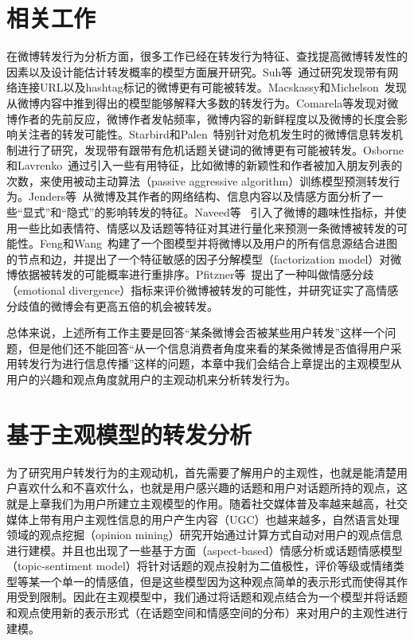 \section{相关工作}
\label{ch6_relatedwork}
在微博转发行为分析方面，很多工作已经在转发行为特征、查找提高微博转发性的因素以及设计能估计转发概率的模型方面展开研究。Suh等~通过研究发现带有网络连接URL以及hashtag标记的微博更有可能被转发。Macskassy和Michelson~发现从微博内容中推到得出的模型能够解释大多数的转发行为。Comarela等发现对微博作者的先前反应，微博作者发帖频率，微博内容的新鲜程度以及微博的长度会影响关注者的转发可能性。Starbird和Palen~特别针对危机发生时的微博信息转发机制进行了研究，发现带有跟带有危机话题关键词的微博更有可能被转发。Osborne和Lavrenko~通过引入一些有用特征，比如微博的新颖性和作者被加入朋友列表的次数，来使用被动主动算法（passive aggressive algorithm）训练模型预测转发行为。Jenders等~从微博及其作者的网络结构、信息内容以及情感方面分析了一些“显式”和“隐式”的影响转发的特征。Naveed等~
引入了微博的趣味性指标，并使用一些比如表情符、情感以及话题等特征对其进行量化来预测一条微博被转发的可能性。Feng和Wang~构建了一个图模型并将微博以及用户的所有信息源结合进图的节点和边，并提出了一个特征敏感的因子分解模型（factorization model）对微博依据被转发的可能概率进行重排序。Pfitzner等~提出了一种叫做情感分歧（emotional divergence）指标来评价微博被转发的可能性，并研究证实了高情感分歧值的微博会有更高五倍的机会被转发。

总体来说，上述所有工作主要是回答“某条微博会否被某些用户转发”这样一个问题，但是他们还不能回答“从一个信息消费者角度来看的某条微博是否值得用户采用转发行为进行信息传播”这样的问题，本章中我们会结合上章提出的主观模型从用户的兴趣和观点角度就用户的主观动机来分析转发行为。
\section{基于主观模型的转发分析}
为了研究用户转发行为的主观动机，首先需要了解用户的主观性，也就是能清楚用户喜欢什么和不喜欢什么，也就是用户感兴趣的话题和用户对话题所持的观点，这就是上章我们为用户所建立主观模型的作用。随着社交媒体普及率越来越高，社交媒体上带有用户主观性信息的用户产生内容（UGC）也越来越多，自然语言处理领域的观点挖掘（opinion mining）研究开始通过计算方式自动对用户的观点信息进行建模。并且也出现了一些基于方面（aspect-based）情感分析或话题情感模型（topic-sentiment model）将针对话题的观点投射为二值极性，评价等级或情绪类型等某一个单一的情感值，但是这些模型因为这种观点简单的表示形式而使得其作用受到限制。因此在主观模型中，我们通过将话题和观点结合为一个模型并将话题和观点使用新的表示形式（在话题空间和情感空间的分布）来对用户的主观性进行建模。

